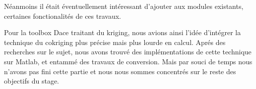 Néanmoins il était éventuellement intéressant d’ajouter aux modules existants,
certaines fonctionalités de ces travaux.

Pour la toolbox Dace traitant du kriging, nous avions ainsi l’idée d'intégrer
la technique du cokriging plus précise mais plus lourde en calcul.
Aprés des recherches sur le sujet, nous avons trouvé des implémentations
de cette technique sur Matlab, et entammé des travaux de conversion.
Mais par souci de temps nous n'avons pas fini cette partie et nous nous
sommes concentr\'es sur le reste des objectifs du stage.

